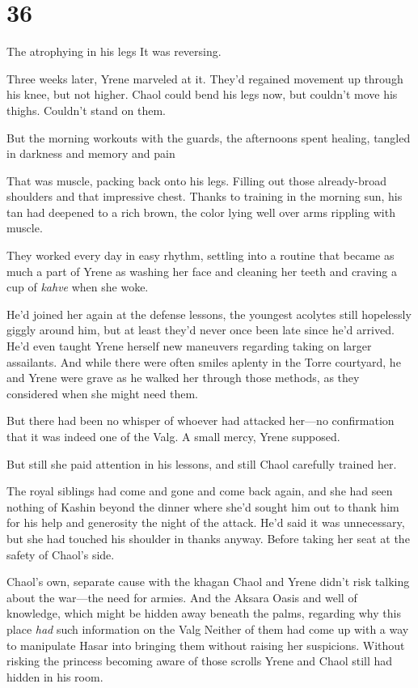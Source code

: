 
\chapter{36}

The atrophying in his legs  It was reversing.

Three weeks later, Yrene marveled at it. They'd regained movement up through his knee, but not higher. Chaol could bend his legs now, but couldn't move his thighs. Couldn't stand on them.

But the morning workouts with the guards, the afternoons spent healing, tangled in darkness and memory and pain 

That was muscle, packing back onto his legs. Filling out those already-broad shoulders and that impressive chest. Thanks to training in the morning sun, his tan had deepened to a rich brown, the color lying well over arms rippling with muscle.

They worked every day in easy rhythm, settling into a routine that became as much a part of Yrene as washing her face and cleaning her teeth and craving a cup of \emph{kahve} when she woke.

He'd joined her again at the defense lessons, the youngest acolytes still hopelessly giggly around him, but at least they'd never once been late since he'd arrived. He'd even taught Yrene herself new maneuvers regarding taking on larger assailants. And while there were often smiles aplenty in the Torre courtyard, he and Yrene were grave as he walked her through those methods, as they considered when she might need them.

But there had been no whisper of whoever had attacked her---no confirmation that it was indeed one of the Valg. A small mercy, Yrene supposed.

But still she paid attention in his lessons, and still Chaol carefully trained her.

The royal siblings had come and gone and come back again, and she had seen nothing of Kashin beyond the dinner where she'd sought him out to thank him for his help and generosity the night of the attack. He'd said it was unnecessary, but she had touched his shoulder in thanks anyway. Before taking her seat at the safety of Chaol's side.

Chaol's own, separate cause with the khagan  Chaol and Yrene didn't risk talking about the war---the need for armies. And the Aksara Oasis and well of knowledge, which might be hidden away beneath the palms, regarding why this place \emph{had} such information on the Valg
 Neither of them had come up with a way to manipulate Hasar into bringing them without raising her suspicions. Without risking the princess becoming aware of those scrolls Yrene and Chaol still had hidden in his room.

